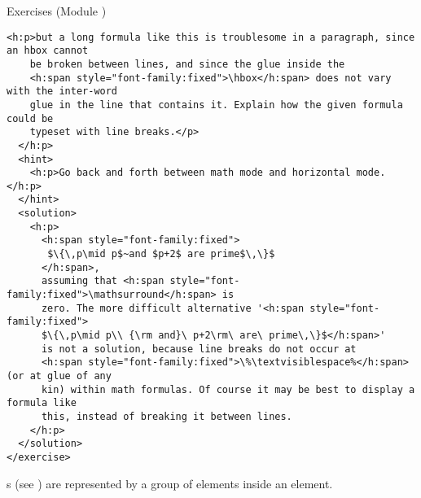 \begin{module}[id=quiz]
\begin{omgroup}[id=quiz,short=Exercises]{Exercises (Module {})}
\begin{lstlisting}[label=lst:texbook-exercise,escapechar=\%,
  caption={An Exercise from the {\TeX}Book},
  index={exercise,hint,solution}]
  <h:p>but a long formula like this is troublesome in a paragraph, since an hbox cannot
    be broken between lines, and since the glue inside the 
    <h:span style="font-family:fixed">\hbox</h:span> does not vary with the inter-word
    glue in the line that contains it. Explain how the given formula could be
    typeset with line breaks.</p>
  </h:p>
  <hint>
    <h:p>Go back and forth between math mode and horizontal mode.</h:p>
  </hint>
  <solution>
    <h:p>
      <h:span style="font-family:fixed">
       $\{\,p\mid p$~and $p+2$ are prime$\,\}$
      </h:span>,
      assuming that <h:span style="font-family:fixed">\mathsurround</h:span> is
      zero. The more difficult alternative '<h:span style="font-family:fixed">
      $\{\,p\mid p\\ {\rm and}\ p+2\rm\ are\ prime\,\}$</h:span>'
      is not a solution, because line breaks do not occur at 
      <h:span style="font-family:fixed">\%\textvisiblespace%</h:span> (or at glue of any
      kin) within math formulas. Of course it may be best to display a formula like
      this, instead of breaking it between lines.
    </h:p>
  </solution>
</exercise>
\end{lstlisting}

 {s} (see {}) are represented by a
  group of  elements inside an  element.


\end{omgroup}
\end{module}
